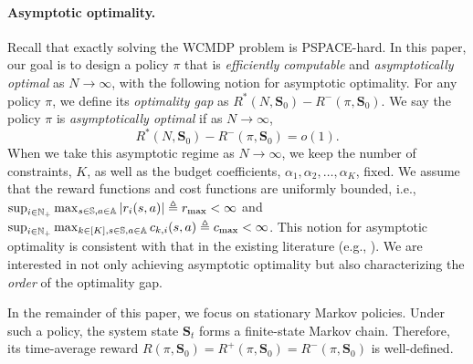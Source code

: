 \documentclass[11pt,letterpaper]{article}
\begin{document}
\paragraph{Asymptotic optimality.}
Recall that exactly solving the WCMDP problem is PSPACE-hard.
In this paper, our goal is to design a policy $\pi$ that is \emph{efficiently computable} and \emph{asymptotically optimal} as $N\to\infty$, with the following notion for asymptotic optimality.
For any policy $\pi$, we define its \emph{optimality gap} as $R^*(N,\bm{S}_0)-R^-(\pi,\bm{S}_0)$.
We say the policy $\pi$ is \emph{asymptotically optimal} if as $N\to\infty$,
\begin{equation}
    R^*(N,\bm{S}_0)-R^-(\pi,\bm{S}_0)=o(1).
\end{equation}
When we take this asymptotic regime as $N\to\infty$, we keep the number of constraints, $K$, as well as the budget coefficients, $\alpha_1,\alpha_2,\dots,\alpha_K$, fixed.
We assume that the reward functions and cost functions are uniformly bounded, i.e., $\sup_{i\in\mathbb{N}_+}\max_{s\in\mathbb{S},a\in\mathbb{A}}|r_i(s,a)|\triangleq r_{\max}<\infty$
and
$\sup_{i\in\mathbb{N}_+}\max_{k\in[K],s\in\mathbb{S},a\in\mathbb{A}}c_{k,i}(s,a)\triangleq c_{\max}<\infty$.
This notion for asymptotic optimality is consistent with that in the existing literature (e.g., \citep[Definition 4.11]{Ver_16_verloop}). We are interested in not only achieving asymptotic optimality but also characterizing the \emph{order} of the optimality gap.


In the remainder of this paper, we focus on stationary Markov policies.
Under such a policy, the system state $\bm{S}_t$ forms a finite-state Markov chain.
Therefore, its time-average reward $R(\pi,\bm{S}_0)= R^+(\pi,\bm{S}_0) = R^-(\pi,\bm{S}_0)$ is well-defined. 
\end{document}
